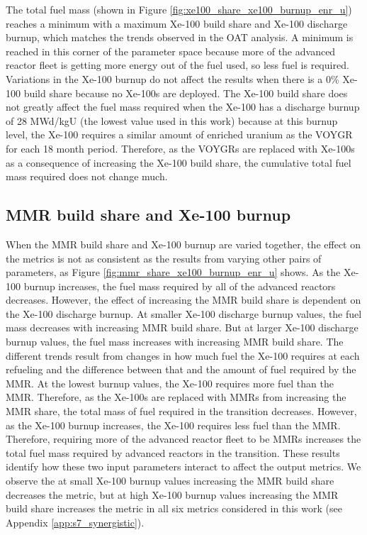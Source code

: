 The total fuel mass (shown in Figure \ref{fig:xe100_share_xe100_burnup_enr_u})
reaches a minimum with a maximum Xe-100 build share 
and Xe-100 discharge burnup, which matches the trends observed in the 
\gls{OAT} analysis. A minimum is reached in this corner of the parameter 
space because more of the advanced reactor fleet is getting more 
energy out of the fuel used, so less fuel is required. Variations in the 
Xe-100 burnup do not affect the results when there is a 0\% Xe-100 build 
share because no Xe-100s are deployed. The Xe-100 build share does not 
greatly affect the fuel mass required when the Xe-100 has a discharge 
burnup of 28 MWd/kgU (the lowest value used in this work) because at this 
burnup level, the Xe-100 requires a similar amount of enriched uranium as 
the VOYGR for each 18 month period. Therefore, as the VOYGRs are replaced 
with Xe-100s as a consequence of increasing the Xe-100 build share, the 
cumulative total 
fuel mass required does not change much. 


\subsection{MMR build share and Xe-100 burnup}
When the \gls{MMR} build share and Xe-100 burnup are varied together, 
the effect on the metrics is not as consistent as the results from varying 
other pairs of parameters, as Figure \ref{fig:mmr_share_xe100_burnup_enr_u}
shows. As the Xe-100 burnup increases, the fuel mass required by 
all of the advanced reactors 
decreases. However, the effect of increasing the \gls{MMR} build share 
is dependent on the Xe-100 discharge burnup. At smaller Xe-100 discharge 
burnup values, the fuel mass decreases with increasing \gls{MMR} build share. 
But at larger Xe-100 discharge burnup values, the fuel mass increases 
with increasing \gls{MMR} build share. The different trends result from 
changes in how much fuel the Xe-100 requires at each refueling and 
the difference between that and the amount of fuel required by the \gls{MMR}.
At the lowest burnup values, the Xe-100 requires more fuel than the 
\gls{MMR}. Therefore, as the Xe-100s are replaced with \glspl{MMR} from 
increasing the \gls{MMR} share, the 
total mass of fuel required in the transition decreases. However, as 
the Xe-100 burnup increases, the Xe-100 requires less fuel than the 
\gls{MMR}. Therefore, requiring more of the advanced reactor fleet to be 
\glspl{MMR} increases the total fuel mass required by advanced reactors in 
the transition. These results identify how these two input parameters 
interact to affect the output metrics. We observe the at small Xe-100 
burnup values increasing the \gls{MMR} build share decreases the metric, but at high Xe-100 burnup 
values increasing the \gls{MMR} build share increases the metric in 
all six metrics considered in this work (see Appendix 
\ref{app:s7_synergistic}).

